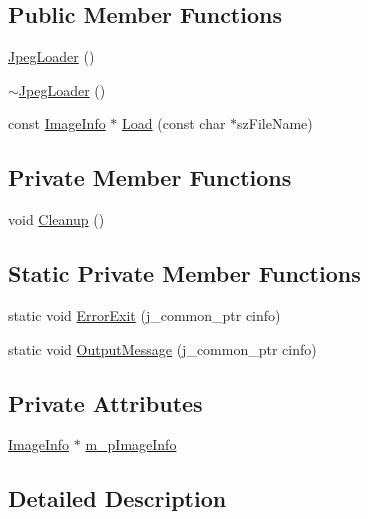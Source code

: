 \subsection*{Public Member Functions}
\begin{DoxyCompactItemize}
\item 
\mbox{\hyperlink{classJpegLoader_a9e61b80045d706af41e80fd28732b2b1}{Jpeg\+Loader}} ()
\item 
\mbox{\hyperlink{classJpegLoader_a7c0a277d94089e1750efa7516fbeb503}{$\sim$\+Jpeg\+Loader}} ()
\item 
const \mbox{\hyperlink{structJpegLoader_1_1ImageInfo}{Image\+Info}} $\ast$ \mbox{\hyperlink{classJpegLoader_a094609a59107dfbd1cca84fa2467c926}{Load}} (const char $\ast$sz\+File\+Name)
\end{DoxyCompactItemize}
\subsection*{Private Member Functions}
\begin{DoxyCompactItemize}
\item 
void \mbox{\hyperlink{classJpegLoader_a77791c29f6eda95770c36399be96822b}{Cleanup}} ()
\end{DoxyCompactItemize}
\subsection*{Static Private Member Functions}
\begin{DoxyCompactItemize}
\item 
static void \mbox{\hyperlink{classJpegLoader_a689be6001605f12b808d82d49eaaba4e}{Error\+Exit}} (j\+\_\+common\+\_\+ptr cinfo)
\item 
static void \mbox{\hyperlink{classJpegLoader_ae23a077fd30b90b04edeb13f89b36a3e}{Output\+Message}} (j\+\_\+common\+\_\+ptr cinfo)
\end{DoxyCompactItemize}
\subsection*{Private Attributes}
\begin{DoxyCompactItemize}
\item 
\mbox{\hyperlink{structJpegLoader_1_1ImageInfo}{Image\+Info}} $\ast$ \mbox{\hyperlink{classJpegLoader_ac5483c3fe2fb14ec56fb2bdda4ba1b50}{m\+\_\+p\+Image\+Info}}
\end{DoxyCompactItemize}


\subsection{Detailed Description}


